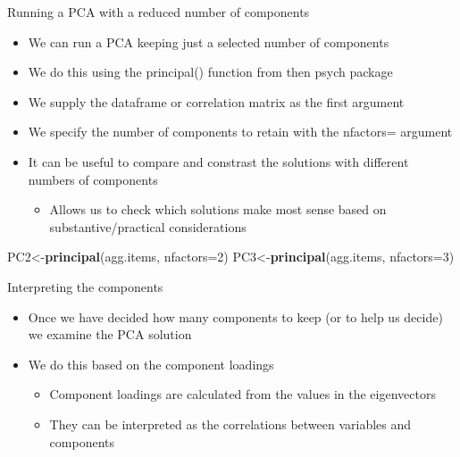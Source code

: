 \documentclass[
  ignorenonframetext,
]{beamer}
\newenvironment{Shaded}{\begin{snugshade}}{\end{snugshade}}
\newcommand{\DataTypeTok}[1]{\textcolor[rgb]{0.13,0.29,0.53}{#1}}
\newcommand{\DecValTok}[1]{\textcolor[rgb]{0.00,0.00,0.81}{#1}}
\newcommand{\KeywordTok}[1]{\textcolor[rgb]{0.13,0.29,0.53}{\textbf{#1}}}
\newcommand{\NormalTok}[1]{#1}
\providecommand{\tightlist}{%
  \setlength{\itemsep}{0pt}\setlength{\parskip}{0pt}}
\begin{document}
\begin{frame}[fragile]{Running a PCA with a reduced number of
components}
\protect\hypertarget{running-a-pca-with-a-reduced-number-of-components}{}

\begin{itemize}
\tightlist
\item
  We can run a PCA keeping just a selected number of components
\item
  We do this using the principal() function from then psych package
\item
  We supply the dataframe or correlation matrix as the first argument
\item
  We specify the number of components to retain with the nfactors=
  argument
\item
  It can be useful to compare and constrast the solutions with different
  numbers of components

  \begin{itemize}
  \tightlist
  \item
    Allows us to check which solutions make most sense based on
    substantive/practical considerations
  \end{itemize}
\end{itemize}

\begin{Shaded}
\begin{Highlighting}[]
\NormalTok{PC2<-}\KeywordTok{principal}\NormalTok{(agg.items, }\DataTypeTok{nfactors=}\DecValTok{2}\NormalTok{) }
\NormalTok{PC3<-}\KeywordTok{principal}\NormalTok{(agg.items, }\DataTypeTok{nfactors=}\DecValTok{3}\NormalTok{) }
\end{Highlighting}
\end{Shaded}

\end{frame}

\begin{frame}{Interpreting the components}
\protect\hypertarget{interpreting-the-components}{}

\begin{itemize}
\tightlist
\item
  Once we have decided how many components to keep (or to help us
  decide) we examine the PCA solution
\item
  We do this based on the component loadings

  \begin{itemize}
  \tightlist
  \item
    Component loadings are calculated from the values in the
    eigenvectors
  \item
    They can be interpreted as the correlations between variables and
    components
  \end{itemize}
\end{itemize}

\end{frame}
\end{document}
